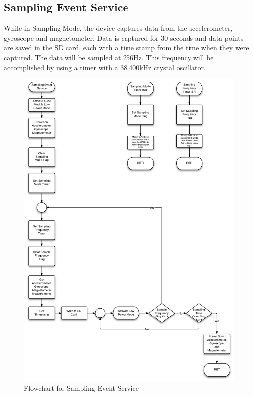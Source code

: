 \subsection{Sampling Event Service}
While in Sampling Mode, the device captures data from the accelerometer, gyroscope and magnetometer. Data is captured for 30 seconds and data points are saved in the SD card, each with a time stamp from the time when they were captured. The data will be sampled at 256Hz. This frequency will be accomplished by using a timer with a 38.400kHz crystal oscillator.
\begin{figure}[H]
	\centering
	\includegraphics[scale=0.7]{img/SamplingEventService}
	\caption{Flowchart for Sampling Event Service \label{fig:samplingMode}}
\end{figure}


